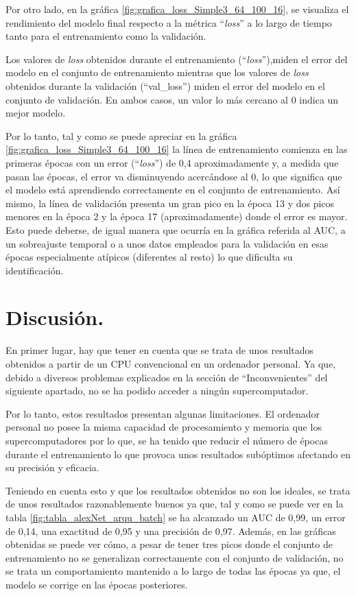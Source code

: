Por otro lado, en la gráfica \ref{fig:grafica_loss_Simple3_64_100_16}, se visualiza el rendimiento del modelo final respecto a la métrica ``\textit{loss}'' a lo largo de tiempo tanto para el entrenamiento como la validación. 

Los valores de \textit{loss} obtenidos durante el entrenamiento (``\textit{loss}''),miden el error del modelo en el conjunto de entrenamiento mientras que los valores de \textit{loss} obtenidos durante la validación (``val\_loss'') miden el error del modelo en el conjunto de validación. En ambos casos, un valor lo más cercano al 0 indica un mejor modelo.

Por lo tanto, tal y como se puede apreciar en la gráfica \ref{fig:grafica_loss_Simple3_64_100_16} la línea de entrenamiento comienza en las primeras épocas con un error (``\textit{loss}'') de 0,4 aproximadamente y, a medida que pasan las épocas, el error va disminuyendo acercándose al 0, lo que significa que el modelo está aprendiendo correctamente en el conjunto de entrenamiento. Así mismo, la línea de validación presenta un gran pico en la época 13 y dos picos menores en la época 2 y la época 17 (aproximadamente) donde el error es mayor. Esto puede deberse, de igual manera que ocurría en la gráfica referida al AUC, a un sobreajuste temporal o a unos datos empleados para la validación en esas épocas especialmente atípicos (diferentes al resto) lo que dificulta su identificación.

\section{Discusión.}

En primer lugar, hay que tener en cuenta que se trata de unos resultados obtenidos a partir de un CPU convencional en un ordenador personal. Ya que, debido a diversos problemas explicados en la sección de ``Inconvenientes'' del siguiente apartado, no se ha podido acceder a ningún supercomputador. 

Por lo tanto, estos resultados presentan algunas limitaciones. El ordenador personal no posee la misma capacidad de procesamiento y memoria que los supercomputadores por lo que, se ha tenido que reducir el número de épocas durante el entrenamiento lo que provoca unos resultados subóptimos afectando en su precisión y eficacia.

Teniendo en cuenta esto y que los resultados obtenidos no son los ideales, se trata de unos resultados razonablemente buenos ya que, tal y como se puede ver en la tabla \ref{fig:tabla_alexNet_arqu_batch} se ha alcanzado un AUC de 0,99, un error de 0,14, una exactitud de 0,95 y una precisión de 0,97. Además, en las gráficas obtenidas se puede ver cómo, a pesar de tener tres picos donde el conjunto de entrenamiento no se generalizan correctamente con el conjunto de validación, no se trata un comportamiento mantenido a lo largo de todas las épocas ya que, el modelo se corrige en las épocas posteriores.

